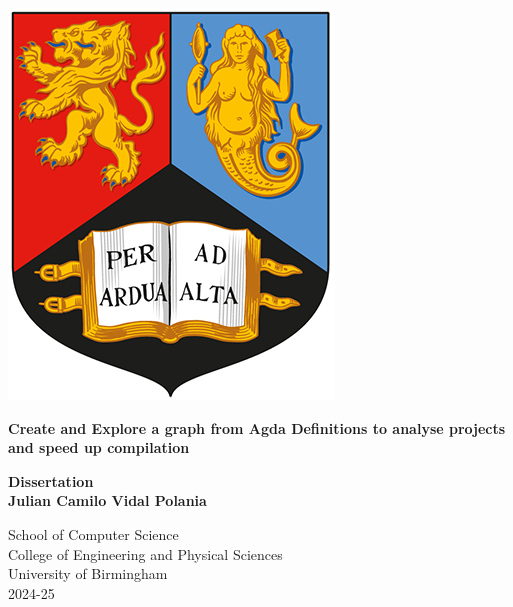 
\thispagestyle{empty}

\begin{spacing}{2}
	\begin{center}
		\includegraphics[scale = 1.5]{Preamble/BirmCrest.png}
	\end{center}
	\vspace{10mm}
	\begin{center}
		\textbf{\Large Create and Explore a graph from Agda Definitions to
		analyse projects and speed up compilation}
		\vspace{10mm}
	\end{center}
	\begin{center}
		\textbf{\large Dissertation}
		\vspace{20mm}
		\\\textbf{\Large Julian Camilo Vidal Polania}
		\vspace{30mm}
	\end{center}
	\begin{center}
		{\large School of Computer Science}
		\\ {\large College of Engineering and Physical Sciences}
		\\ {\large University of Birmingham}
		\\ {\large 2024-25}
	\end{center}
\end{spacing}


